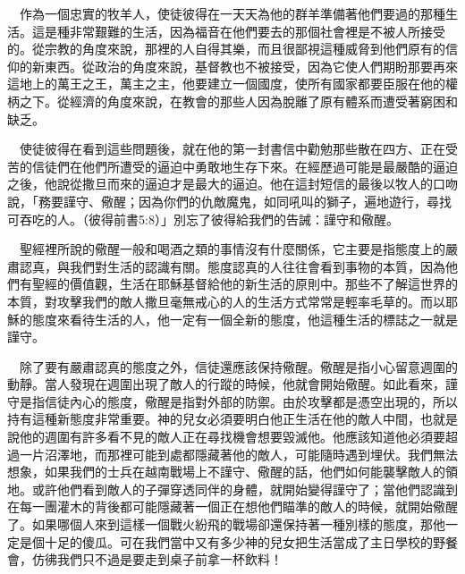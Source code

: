 \documentclass{book}
\begin{document}
\begin{center}
\noindent{}
\end{center}

　作為一個忠實的牧羊人，使徒彼得在一天天為他的群羊準備著他們要過的那種生活。這是種非常艱難的生活，因為福音在他們要去的那個社會裡是不被人所接受的。從宗教的角度來說，那裡的人自得其樂，而且很鄙視這種威脅到他們原有的信仰的新東西。從政治的角度來說，基督教也不被接受，因為它使人們期盼那要再來這地上的萬王之王，萬主之主，他要建立一個國度，使所有國家都要臣服在他的權柄之下。從經濟的角度來說，在教會的那些人因為脫離了原有體系而遭受著窮困和缺乏。

　使徒彼得在看到這些問題後，就在他的第一封書信中勸勉那些散在四方、正在受苦的信徒們在他們所遭受的逼迫中勇敢地生存下來。在經歷過可能是最嚴酷的逼迫之後，他說從撒旦而來的逼迫才是最大的逼迫。他在這封短信的最後以牧人的口吻說，「務要謹守、儆醒；因為你們的仇敵魔鬼，如同吼叫的獅子，遍地遊行，尋找可吞吃的人。（彼得前書5:8）」別忘了彼得給我們的告誡：謹守和儆醒。

　聖經裡所說的儆醒一般和喝酒之類的事情沒有什麼關係，它主要是指態度上的嚴肅認真，與我們對生活的認識有關。態度認真的人往往會看到事物的本質，因為他們有聖經的價值觀，生活在耶穌基督給他的新生活的原則中。那些不了解這世界的本質，對攻擊我們的敵人撒旦毫無戒心的人的生活方式常常是輕率毛草的。而以耶穌的態度來看待生活的人，他一定有一個全新的態度，他這種生活的標誌之一就是謹守。

　除了要有嚴肅認真的態度之外，信徒還應該保持儆醒。儆醒是指小心留意週圍的動靜。當人發現在週圍出現了敵人的行蹤的時候，他就會開始儆醒。如此看來，謹守是指信徒內心的態度，儆醒是指對外部的防禦。由於攻擊都是憑空出現的，所以持有這種新態度非常重要。神的兒女必須要明白他正生活在他的敵人中間，也就是說他的週圍有許多看不見的敵人正在尋找機會想要毀滅他。他應該知道他必須要超過一片沼澤地，而那裡可能到處都隱藏著他的敵人，可能隨時遇到埋伏。我們無法想象，如果我們的士兵在越南戰場上不謹守、儆醒的話，他們如何能襲擊敵人的領地。或許他們看到敵人的子彈穿透同伴的身體，就開始變得謹守了；當他們認識到在每一團灌木的背後都可能隱藏著一個正在想他們瞄準的敵人的時候，就開始儆醒了。如果哪個人來到這樣一個戰火紛飛的戰場卻還保持著一種別樣的態度，那他一定是個十足的傻瓜。可在我們當中又有多少神的兒女把生活當成了主日學校的野餐會，仿彿我們只不過是要走到桌子前拿一杯飲料！
\end{document}
